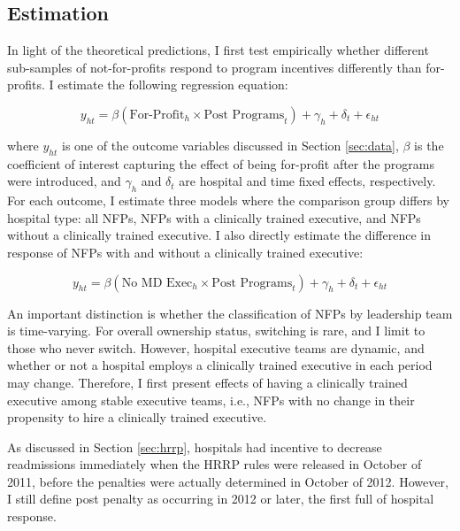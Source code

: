 \documentclass[12pt]{article}
\begin{document}
    \subsection{Estimation}

    In light of the theoretical predictions, I first test empirically whether different sub-samples of not-for-profits respond to program incentives differently than for-profits. I estimate the following regression equation:

    \begin{equation}
    \label{eq:forprofit}
    y_{ht} = \beta (\text{For-Profit}_h \times \text{Post Programs}_t) + \gamma_{h} + \delta_t + \epsilon_{ht}
    \end{equation}

    \noindent where $y_{ht}$ is one of the outcome variables discussed in Section \ref{sec:data}, $\beta$ is the coefficient of interest capturing the effect of being for-profit after the programs were introduced, and $\gamma_h$ and $\delta_t$ are hospital and time fixed effects, respectively. For each outcome, I estimate three models where the comparison group differs by hospital type: all NFPs, NFPs with a clinically trained executive, and NFPs without a clinically trained executive. I also directly estimate the difference in response of NFPs with and without a clinically trained executive:

    \begin{equation}
    \label{eq:clinical}
    y_{ht} = \beta (\text{No MD Exec}_h \times \text{Post Programs}_t) + \gamma_{h} + \delta_t + \epsilon_{ht}
    \end{equation}

    An important distinction is whether the classification of NFPs by leadership team is time-varying. For overall ownership status, switching is rare, and I limit to those who never switch. However, hospital executive teams are dynamic, and whether or not a hospital employs a clinically trained executive in each period may change. Therefore, I first present effects of having a clinically trained executive among stable executive teams, i.e., NFPs with no change in their propensity to hire a clinically trained executive. 
    
    As discussed in Section \ref{sec:hrrp}, hospitals had incentive to decrease readmissions immediately when the HRRP rules were released in October of 2011, before the penalties were actually determined in October of 2012. However, I still define post penalty as occurring in 2012 or later, the first full of hospital response.
\end{document}
